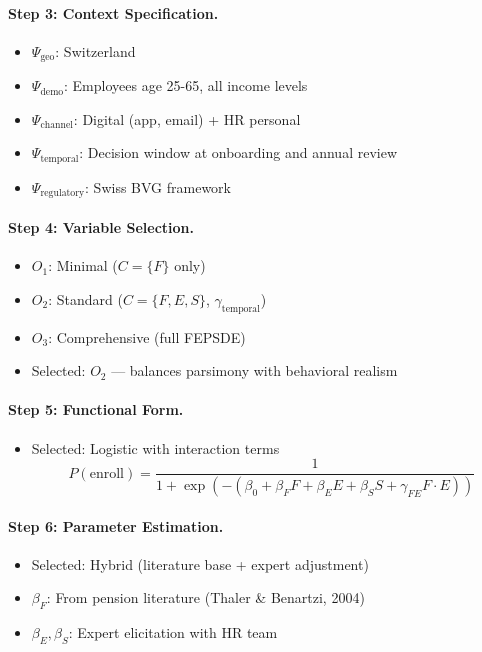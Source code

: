 \paragraph{Step 3: Context Specification.}
\begin{itemize}
\item $\Psi_{\text{geo}}$: Switzerland
\item $\Psi_{\text{demo}}$: Employees age 25-65, all income levels
\item $\Psi_{\text{channel}}$: Digital (app, email) + HR personal
\item $\Psi_{\text{temporal}}$: Decision window at onboarding and annual review
\item $\Psi_{\text{regulatory}}$: Swiss BVG framework
\end{itemize}

\paragraph{Step 4: Variable Selection.}
\begin{itemize}
\item $O_1$: Minimal ($C = \{F\}$ only)
\item $O_2$: Standard ($C = \{F, E, S\}$, $\gamma_{\text{temporal}}$)
\item $O_3$: Comprehensive (full FEPSDE)
\item Selected: $O_2$ --- balances parsimony with behavioral realism
\end{itemize}

\paragraph{Step 5: Functional Form.}
\begin{itemize}
\item Selected: Logistic with interaction terms
\begin{equation}
P(\text{enroll}) = \frac{1}{1 + \exp(-(\beta_0 + \beta_F F + \beta_E E + \beta_S S + \gamma_{FE} F \cdot E))}
\end{equation}
\end{itemize}

\paragraph{Step 6: Parameter Estimation.}
\begin{itemize}
\item Selected: Hybrid (literature base + expert adjustment)
\item $\beta_F$: From pension literature (Thaler \& Benartzi, 2004)
\item $\beta_E, \beta_S$: Expert elicitation with HR team
\end{itemize}

